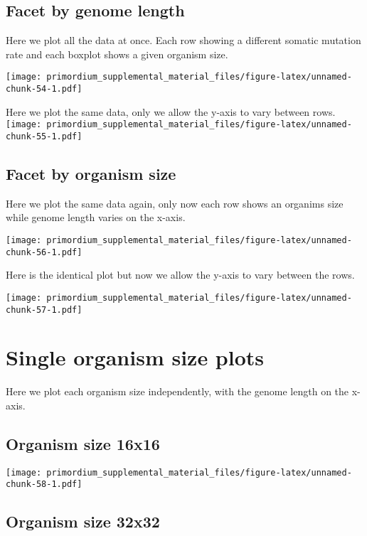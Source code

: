 \documentclass[]{book}
\begin{document}
\hypertarget{facet-by-genome-length}{%
\subsection{Facet by genome length}\label{facet-by-genome-length}}

Here we plot all the data at once.
Each row showing a different somatic mutation rate and each boxplot shows a given organism size.

\texttt{[image: primordium\_supplemental\_material\_files/figure-latex/unnamed-chunk-54-1.pdf]}

Here we plot the same data, only we allow the y-axis to vary between rows.
\texttt{[image: primordium\_supplemental\_material\_files/figure-latex/unnamed-chunk-55-1.pdf]}

\hypertarget{facet-by-organism-size-2}{%
\subsection{Facet by organism size}\label{facet-by-organism-size-2}}

Here we plot the same data again, only now each row shows an organims size while genome length varies on the x-axis.

\texttt{[image: primordium\_supplemental\_material\_files/figure-latex/unnamed-chunk-56-1.pdf]}

Here is the identical plot but now we allow the y-axis to vary between the rows.

\texttt{[image: primordium\_supplemental\_material\_files/figure-latex/unnamed-chunk-57-1.pdf]}

\hypertarget{single-organism-size-plots-3}{%
\section{Single organism size plots}\label{single-organism-size-plots-3}}

Here we plot each organism size independently, with the genome length on the x-axis.

\hypertarget{organism-size-16x16-2}{%
\subsection{Organism size 16x16}\label{organism-size-16x16-2}}

\texttt{[image: primordium\_supplemental\_material\_files/figure-latex/unnamed-chunk-58-1.pdf]}

\hypertarget{organism-size-32x32-2}{%
\subsection{Organism size 32x32}\label{organism-size-32x32-2}}
\end{document}
